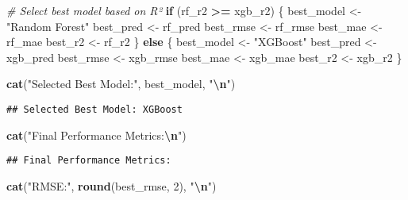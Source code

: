 \documentclass[
]{article}
\newenvironment{Shaded}{\begin{snugshade}}{\end{snugshade}}
\newcommand{\CommentTok}[1]{\textcolor[rgb]{0.56,0.35,0.01}{\textit{#1}}}
\newcommand{\ControlFlowTok}[1]{\textcolor[rgb]{0.13,0.29,0.53}{\textbf{#1}}}
\newcommand{\DecValTok}[1]{\textcolor[rgb]{0.00,0.00,0.81}{#1}}
\newcommand{\FunctionTok}[1]{\textcolor[rgb]{0.13,0.29,0.53}{\textbf{#1}}}
\newcommand{\NormalTok}[1]{#1}
\newcommand{\OtherTok}[1]{\textcolor[rgb]{0.56,0.35,0.01}{#1}}
\newcommand{\SpecialCharTok}[1]{\textcolor[rgb]{0.81,0.36,0.00}{\textbf{#1}}}
\newcommand{\StringTok}[1]{\textcolor[rgb]{0.31,0.60,0.02}{#1}}
\begin{document}
\begin{Shaded}
\begin{Highlighting}[]
\CommentTok{\# Select best model based on R²}
\ControlFlowTok{if}\NormalTok{ (rf\_r2 }\SpecialCharTok{\textgreater{}=}\NormalTok{ xgb\_r2) \{}
\NormalTok{  best\_model }\OtherTok{\textless{}{-}} \StringTok{"Random Forest"}
\NormalTok{  best\_pred }\OtherTok{\textless{}{-}}\NormalTok{ rf\_pred}
\NormalTok{  best\_rmse }\OtherTok{\textless{}{-}}\NormalTok{ rf\_rmse}
\NormalTok{  best\_mae }\OtherTok{\textless{}{-}}\NormalTok{ rf\_mae}
\NormalTok{  best\_r2 }\OtherTok{\textless{}{-}}\NormalTok{ rf\_r2}
\NormalTok{\} }\ControlFlowTok{else}\NormalTok{ \{}
\NormalTok{  best\_model }\OtherTok{\textless{}{-}} \StringTok{"XGBoost"}
\NormalTok{  best\_pred }\OtherTok{\textless{}{-}}\NormalTok{ xgb\_pred}
\NormalTok{  best\_rmse }\OtherTok{\textless{}{-}}\NormalTok{ xgb\_rmse}
\NormalTok{  best\_mae }\OtherTok{\textless{}{-}}\NormalTok{ xgb\_mae}
\NormalTok{  best\_r2 }\OtherTok{\textless{}{-}}\NormalTok{ xgb\_r2}
\NormalTok{\}}

\FunctionTok{cat}\NormalTok{(}\StringTok{"Selected Best Model:"}\NormalTok{, best\_model, }\StringTok{"}\SpecialCharTok{\textbackslash{}n}\StringTok{"}\NormalTok{)}
\end{Highlighting}
\end{Shaded}

\begin{verbatim}
## Selected Best Model: XGBoost
\end{verbatim}

\begin{Shaded}
\begin{Highlighting}[]
\FunctionTok{cat}\NormalTok{(}\StringTok{"Final Performance Metrics:}\SpecialCharTok{\textbackslash{}n}\StringTok{"}\NormalTok{)}
\end{Highlighting}
\end{Shaded}

\begin{verbatim}
## Final Performance Metrics:
\end{verbatim}

\begin{Shaded}
\begin{Highlighting}[]
\FunctionTok{cat}\NormalTok{(}\StringTok{"RMSE:"}\NormalTok{, }\FunctionTok{round}\NormalTok{(best\_rmse, }\DecValTok{2}\NormalTok{), }\StringTok{"}\SpecialCharTok{\textbackslash{}n}\StringTok{"}\NormalTok{)}
\end{Highlighting}
\end{Shaded}
\end{document}
